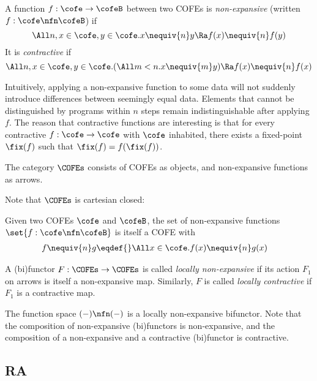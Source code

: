 \begin{defn}
  A function $f : \cofe \to \cofeB$ between two COFEs is \emph{non-expansive} (written $f : \cofe \nfn \cofeB$) if
  \[\All n, x \in \cofe, y \in \cofe. x \nequiv{n} y \Ra f(x) \nequiv{n} f(y) \]
  It is \emph{contractive} if
  \[ \All n, x \in \cofe, y \in \cofe. (\All m < n. x \nequiv{m} y) \Ra f(x) \nequiv{n} f(x) \]
\end{defn}
Intuitively, applying a non-expansive function to some data will not suddenly introduce differences between seemingly equal data.
Elements that cannot be distinguished by programs within $n$ steps remain indistinguishable after applying $f$.
The reason that contractive functions are interesting is that for every contractive $f : \cofe \to \cofe$ with $\cofe$ inhabited, there exists a fixed-point $\fix(f)$ such that $\fix(f) = f(\fix(f))$.

\begin{defn}
  The category $\COFEs$ consists of COFEs as objects, and non-expansive functions as arrows.
\end{defn}

Note that $\COFEs$ is cartesian closed:
\begin{defn}
  Given two COFEs $\cofe$ and $\cofeB$, the set of non-expansive functions $\set{f : \cofe \nfn \cofeB}$ is itself a COFE with
  \begin{align*}
    f \nequiv{n} g \eqdef{}& \All x \in \cofe. f(x) \nequiv{n} g(x)
  \end{align*}
\end{defn}

\begin{defn}
  A (bi)functor $F : \COFEs \to \COFEs$ is called \emph{locally non-expansive} if its action $F_1$ on arrows is itself a non-expansive map.
  Similarly, $F$ is called \emph{locally contractive} if $F_1$ is a contractive map.
\end{defn}
The function space $(-) \nfn (-)$ is a locally non-expansive bifunctor.
Note that the composition of non-expansive (bi)functors is non-expansive, and the composition of a non-expansive and a contractive (bi)functor is contractive.

\subsection{RA}

